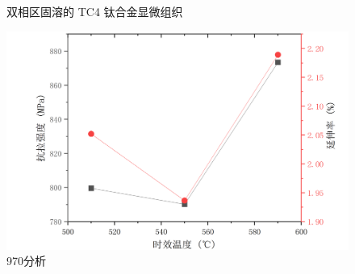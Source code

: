 \begin{figure}[htbp]
{\begin{minipage}[t]{0.33\linewidth}
			\label{fig:990590}
		\end{minipage}%
	}%
	\centering
	\caption{双相区固溶的 TC4 钛合金显微组织}
\end{figure}

\begin{figure}[h!]
	\centering
	\includegraphics[width=0.7\linewidth]{pic/970分析}
	\caption{970分析}
	\label{fig:970}
\end{figure}




